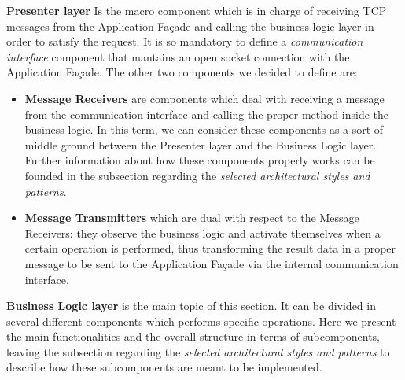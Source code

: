 \textbf{Presenter layer}
        Is the macro component which is in charge of receiving TCP messages from the Application Façade and calling the business logic layer in order to satisfy the request. It is so mandatory to define a \emph{communication interface} component that mantains an open socket connection with the Application Façade. The other two components we decided to define are:
        \begin{itemize}
            \item \textbf{Message Receivers} are components which deal with receiving a message from the communication interface and calling the proper method inside the business logic. In this term, we can consider these components as a sort of middle ground between the Presenter layer and the Business Logic layer. Further information about how these components properly works can be founded in the subsection regarding the \emph{selected architectural styles and patterns}.
            \item \textbf{Message Transmitters} which are dual with respect to the Message Receivers: they observe the business logic and activate themselves when a certain operation is performed, thus transforming the result data in a proper message to be sent to the Application Façade via the internal communication interface.
        \end{itemize}

\textbf{Business Logic layer} is the main topic of this section. It can be divided in several different components which performs specific operations. Here we present the main functionalities and the overall structure in terms of subcomponents, leaving the subsection regarding the \emph{selected architectural styles and patterns} to describe how these subcomponents are meant to be implemented.

